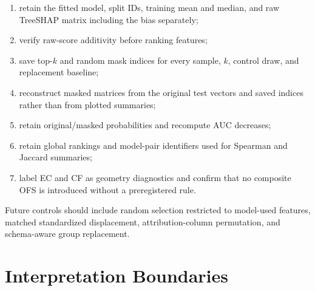 \begin{enumerate}
    \item retain the fitted model, split IDs, training mean and median, and raw
    TreeSHAP matrix including the bias separately;
    \item verify raw-score additivity before ranking features;
    \item save top-$k$ and random mask indices for every sample, $k$, control
    draw, and replacement baseline;
    \item reconstruct masked matrices from the original test vectors and saved
    indices rather than from plotted summaries;
    \item retain original/masked probabilities and recompute AUC decreases;
    \item retain global rankings and model-pair identifiers used for Spearman and
    Jaccard summaries;
    \item label EC and CF as geometry diagnostics and confirm that no composite
    OFS is introduced without a preregistered rule.
\end{enumerate}

Future controls should include random selection restricted to model-used
features, matched standardized displacement, attribution-column permutation, and
schema-aware group replacement.

\section{Interpretation Boundaries}

